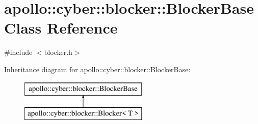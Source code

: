 \hypertarget{classapollo_1_1cyber_1_1blocker_1_1BlockerBase}{\section{apollo\-:\-:cyber\-:\-:blocker\-:\-:Blocker\-Base Class Reference}
\label{classapollo_1_1cyber_1_1blocker_1_1BlockerBase}
}


{\ttfamily \#include $<$blocker.\-h$>$}

Inheritance diagram for apollo\-:\-:cyber\-:\-:blocker\-:\-:Blocker\-Base\-:\begin{figure}[H]
\begin{center}
\leavevmode
\includegraphics[height=2.000000cm]{classapollo_1_1cyber_1_1blocker_1_1BlockerBase}
\end{center}
\end{figure}
